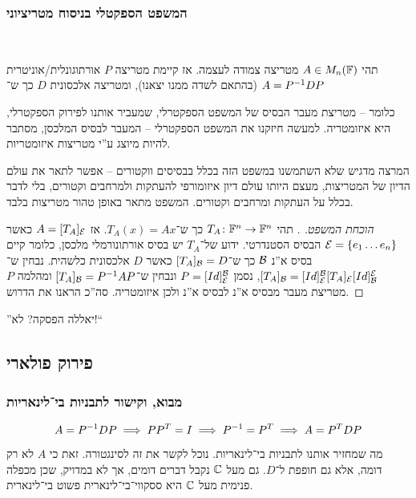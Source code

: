 \documentclass[name=רשימות אלגברה לינארית 2א]{../../../tex/classes/megasumPreamble}
\begin{document}
	
	\subsubsection{המשפט הספקטלי בניסוח מטריציוני}\ 
	\begin{Theorem}
		תהי $A \in M_n(\mathbb{F})$ מטריצה צמודה לעצמה. אז קיימת  מטריצה $P$ אורתוגונלית/אוניטרית (בהתאם לשדה ממנו יצאנו), ומטריצה אלכסונית $D$ כך ש־
		$ A = P^{-1} D P $
	\end{Theorem}
	כלומר – מטריצת מעבר הבסיס של המשפט הספקטרלי, שמעביר אותנו לפירוק הספקטרלי, היא איזומטריה. למעשה חיזקנו את המשפט הספקטרלי – המעבר לבסיס המלכסן, מסתבר להיות מיוצג ע''י מטריצות איזומטריות. 
	
	המרצה מדגיש שלא השתמשנו במשפט הזה בכלל בבסיסים ווקטורים – אפשר לתאר את עולם הדיון של המטריצות, מעצם היותו עולם דיון איזומורפי להעתקות ולמרחבים וקטורים, בלי לדבר בכלל על העתקות ומרחבים וקטורים. המשפט מתאר באופן טהור מטריצות בלבד. 
	
	\begin{proof}[הוכחת המשפט. ]
		תהי $T_A \colon \mathbb{F}^n \to \mathbb{F}^n$ כך ש־$T_A(x) = Ax$. אז $A= [T_A]_{\mathcal{E}}$ כאשר $\mathcal{E} = \{e_1 \dots e_n\}$ הבסיס הסטנדרטי. ידוע של־$T_A$ יש בסיס אורתונורמלי מלכסן, כלומר קיים בסיס א''נ $\mathcal{B}$ כך ש־$[T_A]_{\mathcal{B}} = D$ כאשר $D$ אלכסונית כלשהית. נבחין ש־$[T_A]_{\mathcal{B}} = [Id]^{\mathcal{B}}_{\mathcal{E}} [T_A]_{\mathcal{E}} [Id]_{\mathcal{B}}^{\mathcal{E}}$, נסמן $P = [Id]^{\mathcal{B}}_{\mathcal{E}}$ ונבחין ש־$[T_A]_{\mathcal{B}} = P^{-1} AP$ ומהלמה $P$ מטריצת מעבר מבסיס א''נ לבסיס א''נ ולכן איזומטריה. סה''כ הראנו את הדרוש. 
	\end{proof}
	
	''יאללה הפסקה? לא!``
	
	\subsection{פירוק פולארי}
	\subsubsection{מבוא, וקישור לתבניות בי־לינאריות}
	\[ A = P^{-1} DP \implies PP^T = I \implies P^{-1} = P^T \implies A = P^TDP \]
	מה שמחזיר אותנו לתבניות בי־לינאריות. נוכל לקשר את זה לסינגטורה. זאת כי $A$ לא רק דומה, אלא גם חופפת ל־$D$. גם מעל $\mathbb{C}$ נקבל דברים דומים, אך לא במדויק, שכן מכפלה פנימית מעל $\mathbb{C}$ היא ססקווי־בי־לינארית פשוט בי־לינארית. 
	
\end{document}
